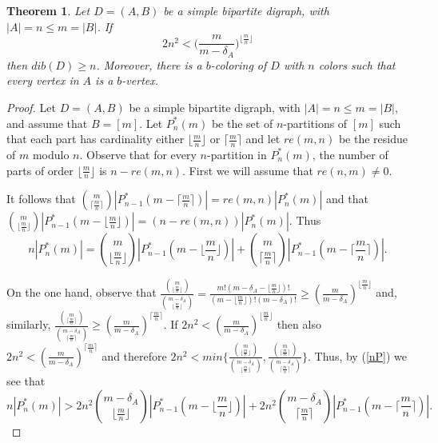 \documentclass[12pt]{article}
\newtheorem{theorem}{Theorem}
\begin{document}
\begin{theorem}\label{partitions} Let $D =(A, B)$ be a simple bipartite  digraph, with $|A| = n\leq m = |B|$. If 
$$2n^2 <  \Big(\frac{m}{m-\delta_A}\Big)^{\lfloor\frac{m}{n}\rfloor}$$ then $dib(D)\geq n$. Moreover, there is a $b$-coloring of $D$ with $n$ colors such that every vertex in $A$ is a $b$-vertex. 
\end{theorem}
\begin{proof}
Let $D =(A, B)$ be a simple bipartite  digraph, with $|A| = n\leq m = |B|$, and assume that $B=[m]$. Let $P^*_n(m)$ be the set of $n$-partitions of $[m]$ such that each part has cardinality either $\lfloor\frac{m}{n}\rfloor$ or $\lceil\frac{m}{n}\rceil$ and let  $re(m,n)$ be the residue of $m$ modulo $n$. Observe that for every $n$-partition in $P^*_n(m)$, the number of parts of order $\lfloor\frac{m}{n}\rfloor$ is $n-re(m,n)$.  First we will assume that $re(n,m) \not=0$. 

It follows that ${{m}\choose {\lceil\frac{m}{n}\rceil}}|P^*_{n-1}(m-\lceil\frac{m}{n}\rceil)| = re(m,n) |P^*_n(m)|$ and that ${{m}\choose {\lfloor\frac{m}{n}\rfloor}}|P^*_{n-1}(m-\lfloor\frac{m}{n}\rfloor)| = (n-re(m,n)) |P^*_n(m)|$.  Thus 
\begin{equation}\label{nP} n|P^*_n(m)| = {{m}\choose {\lfloor\frac{m}{n}\rfloor}}|P^*_{n-1}(m-\lfloor\frac{m}{n}\rfloor)|+ {{m}\choose {\lceil\frac{m}{n}\rceil}}|P^*_{n-1}(m-\lceil\frac{m}{n}\rceil)|.\end{equation}

On the one hand, observe that $\frac{{{m}\choose{\lfloor\frac{m}{n}\rfloor}}}{{{m-\delta_A}\choose{\lfloor\frac{m}{n}\rfloor}}}=  \frac{m!(m-\delta_A-\lfloor\frac{m}{n}\rfloor)!}{(m-\lfloor\frac{m}{n}\rfloor)!(m-\delta_A)!}\geq (\frac{m}{m-\delta_A})^{\lfloor\frac{m}{n}\rfloor}$ and, similarly, $\frac{{{m}\choose{\lceil\frac{m}{n}\rceil}}}{{{m-\delta_A}\choose{\lceil\frac{m}{n}\rceil}}} \geq (\frac{m}{m-\delta_A})^{\lceil\frac{m}{n}\rceil}$. If $2n^2 <  (\frac{m}{m-\delta_A})^{\lfloor\frac{m}{n}\rfloor} $ then also $2n^2 <(\frac{m}{m-\delta_A})^{\lceil\frac{m}{n}\rceil}$ and therefore $2n^2< min\{\frac{{{m}\choose{\lfloor\frac{m}{n}\rfloor}}}{{{m-\delta_A}\choose{\lfloor\frac{m}{n}\rfloor}}}, \frac{{{m}\choose{\lceil\frac{m}{n}\rceil}}}{{{m-\delta_A}\choose{\lceil\frac{m}{n}\rceil}}}\}$.  Thus, by (\ref{nP}) we see that \begin{equation}\label{1} n|P^*_n(m)| >  2n^2{{m-\delta_A}\choose{\lfloor\frac{m}{n}\rfloor}}|P^*_{n-1}(m-\lfloor\frac{m}{n}\rfloor)|+ 2n^2{{m-\delta_A}\choose{\lceil\frac{m}{n}\rceil}}|P^*_{n-1}(m-\lceil\frac{m}{n}\rceil)|.\end{equation}


\end{proof}
\end{document}
